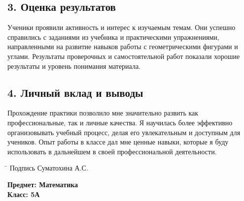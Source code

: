 \documentclass[a4paper,12pt]{article}
\begin{document}
\subsection*{3. Оценка результатов}

Ученики проявили активность и интерес к изучаемым темам. Они успешно справились с заданиями из учебника и практическими упражнениями, направленными на развитие навыков работы с геометрическими фигурами и углами. Результаты проверочных и самостоятельной работ показали хорошие результаты и уровень понимания материала.

\subsection*{4. Личный вклад и выводы}

Прохождение практики позволило мне значительно развить как профессиональные, так и личные качества. Я научилась более эффективно организовывать учебный процесс, делая его увлекательным и доступным для учеников. Опыт работы в классе дал мне ценные навыки, которые я буду использовать в дальнейшем в своей профессиональной деятельности.

\noindent
\begin{tabbing}
\hspace{2cm} \= \kill
Подпись \> \underline{\hspace{4cm}} Суматохина А.С.
\end{tabbing}

\vspace{5mm}

\noindent
\textbf{Предмет: Математика}\\
\textbf{Класс: 5А}\\
\end{document}
